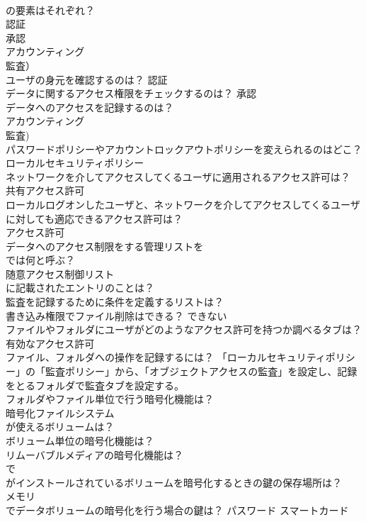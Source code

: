 \documentclass[8pt]{extreport}
\begin{document}
\begin{CJK}{UTF8}{min}
\\	の要素はそれぞれ？	
\\	認証 
\\	承認 
\\	アカウンティング　
\\	監査）
\\	ユーザの身元を確認するのは？	認証 
\\	データに関するアクセス権限をチェックするのは？	承認
\\	データへのアクセスを記録するのは？	
\\	アカウンティング 
\\	監査)
\\	パスワードポリシーやアカウントロックアウトポリシーを変えられるのはどこ？	ローカルセキュリティポリシー
\\	ネットワークを介してアクセスしてくるユーザに適用されるアクセス許可は？	共有アクセス許可
\\	ローカルログオンしたユーザと、ネットワークを介してアクセスしてくるユーザに対しても適応できるアクセス許可は？	
\\	アクセス許可
\\	データへのアクセス制限をする管理リストを
\\	では何と呼ぶ？	
\\	随意アクセス制御リスト
\\	に記載されたエントリのことは？	
\\	監査を記録するために条件を定義するリストは？	
\\	書き込み権限でファイル削除はできる？	できない
\\	ファイルやフォルダにユーザがどのようなアクセス許可を持つか調べるタブは？	有効なアクセス許可
\\	ファイル、フォルダへの操作を記録するには？	「ローカルセキュリティポリシー」の「監査ポリシー」から、「オブジェクトアクセスの監査」を設定し、記録をとるフォルダで監査タブを設定する。
\\	フォルダやファイル単位で行う暗号化機能は？	
\\	暗号化ファイルシステム
\\	が使えるボリュームは？	
\\	ボリューム単位の暗号化機能は？	
\\	リムーバブルメディアの暗号化機能は？	
\\	で
\\	がインストールされているボリュームを暗号化するときの鍵の保存場所は？	
\\	メモリ
\\	でデータボリュームの暗号化を行う場合の鍵は？	パスワード スマートカード

\end{CJK}
\end{document}
